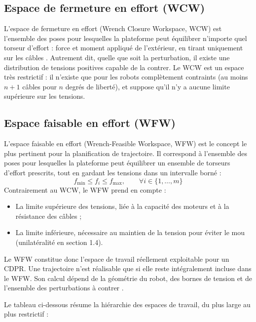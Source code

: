 \subsection{Espace de fermeture en effort (WCW)}

L'espace de fermeture en effort (Wrench Closure Workspace, WCW) est l'ensemble des poses pour lesquelles la plateforme peut équilibrer n'importe quel torseur d'effort : force et moment appliqué de l'extérieur, en tirant uniquement sur les câbles \cite{duan2014}. Autrement dit, quelle que soit la perturbation, il existe une distribution de tensions positives capable de la contrer. Le WCW est un espace très restrictif : il n'existe que pour les robots complètement contraints (au moins $n+1$ câbles pour $n$ degrés de liberté), et suppose qu'il n'y a aucune limite supérieure sur les tensions.

\subsection{Espace faisable en effort (WFW)}

L'espace faisable en effort (Wrench-Feasible Workspace, WFW) est le concept le plus pertinent pour la planification de trajectoire. Il correspond à l'ensemble des poses pour lesquelles la plateforme peut équilibrer un ensemble de torseurs d'effort prescrits, tout en gardant les tensions dans un intervalle borné :
\begin{equation}
f_{\min} \le f_i \le f_{\max}, \qquad \forall i \in \{1, \dots, m\}
\label{eq:wfw}
\end{equation}
Contrairement au WCW, le WFW prend en compte :
\begin{itemize}
\item La limite supérieure des tensions, liée à la capacité des moteurs et à la résistance des câbles ;
\item La limite inférieure, nécessaire au maintien de la tension pour éviter le mou (unilatéralité en section 1.4).
\end{itemize}
Le WFW constitue donc l'espace de travail réellement exploitable pour un CDPR. Une trajectoire n'est réalisable que si elle reste intégralement incluse dans le WFW. Son calcul dépend de la géométrie du robot, des bornes de tension et de l'ensemble des perturbations à contrer \cite{duan2014}.

Le tableau ci-dessous résume la hiérarchie des espaces de travail, du plus large au plus restrictif :

